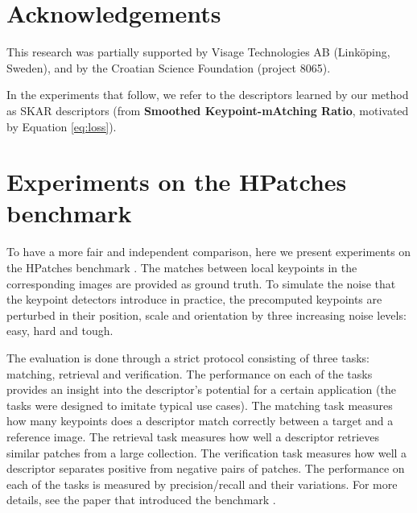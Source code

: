 \documentclass[10pt,conference,a4paper]{IEEEtran}
\begin{document}
	\section*{Acknowledgements}
	This research was partially supported by Visage Technologies AB (Link\"oping, Sweden), and by the Croatian Science Foundation (project 8065).

	
	

	\newpage
	In the experiments that follow, we refer to the descriptors learned by our method as SKAR descriptors
	(from \textbf{Smoothed Keypoint-mAtching Ratio}, motivated by Equation \eqref{eq:loss}).

	\section*{Experiments on the HPatches benchmark}
		To have a more fair and independent comparison, here we present experiments on the HPatches benchmark \cite{hpatches}.
		The matches between local keypoints in the corresponding images are provided as ground truth.
		To simulate the noise that the keypoint detectors introduce in practice, the precomputed keypoints are perturbed in their position, scale and orientation by three increasing noise levels:
		easy, hard and tough.

		The evaluation is done through a strict protocol consisting of three tasks: matching, retrieval and verification.
		The performance on each of the tasks provides an insight into the descriptor's potential for a certain application
		(the tasks were designed to imitate typical use cases).
		The matching task measures how many keypoints does a descriptor match correctly between a target and a reference image.
		The retrieval task measures how well a descriptor retrieves similar patches from a large collection.
		The verification task measures how well a descriptor separates positive from negative pairs of patches.
		The performance on each of the tasks is measured by precision/recall and their variations.
		For more details, see the paper that introduced the benchmark \cite{hpatches}.
\end{document}
